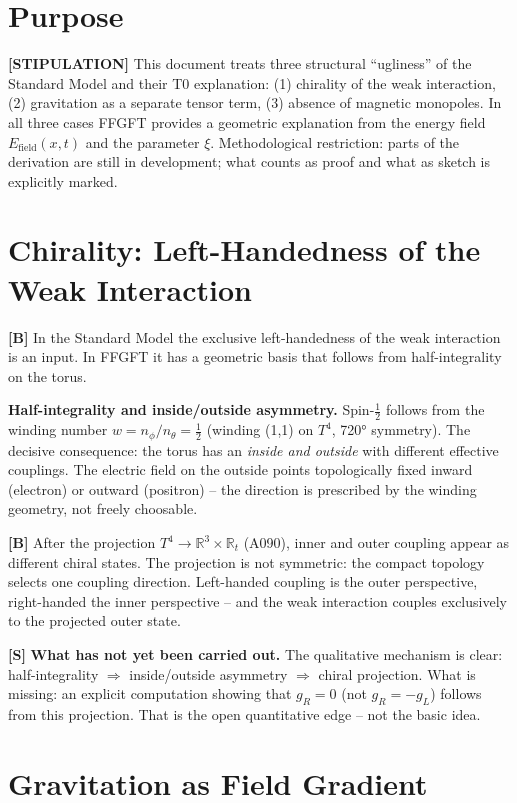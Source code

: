 \section{Purpose}

\textbf{[STIPULATION]} This document treats three structural ``ugliness'' of the
Standard Model and their T0 explanation: (1) chirality of the weak interaction,
(2) gravitation as a separate tensor term, (3) absence of magnetic monopoles.
In all three cases FFGFT provides a geometric explanation from the energy field
$E_\text{field}(x,t)$ and the parameter $\xi$. Methodological restriction: parts
of the derivation are still in development; what counts as proof and what as sketch
is explicitly marked.

\section{Chirality: Left-Handedness of the Weak Interaction}

\textbf{[B]} In the Standard Model the exclusive left-handedness of the weak
interaction is an input. In FFGFT it has a geometric basis that follows from
half-integrality on the torus.

\textbf{Half-integrality and inside/outside asymmetry.} Spin-$\tfrac12$ follows
from the winding number $w=n_\phi/n_\theta=\tfrac12$ (winding (1,1) on $T^4$,
720° symmetry). The decisive consequence: the torus has an \emph{inside and
outside} with different effective couplings. The electric field on the outside
points topologically fixed inward (electron) or outward (positron) -- the direction
is prescribed by the winding geometry, not freely choosable.

\textbf{[B]} After the projection $T^4\to\mathbb{R}^3\times\mathbb{R}_t$ (A090),
inner and outer coupling appear as different chiral states. The projection is not
symmetric: the compact topology selects one coupling direction. Left-handed coupling
is the outer perspective, right-handed the inner perspective -- and the weak
interaction couples exclusively to the projected outer state.

\textbf{[S]} \textbf{What has not yet been carried out.} The qualitative mechanism
is clear: half-integrality $\Rightarrow$ inside/outside asymmetry $\Rightarrow$
chiral projection. What is missing: an explicit computation showing that $g_R=0$
(not $g_R=-g_L$) follows from this projection. That is the open quantitative
edge -- not the basic idea.

\section{Gravitation as Field Gradient}

